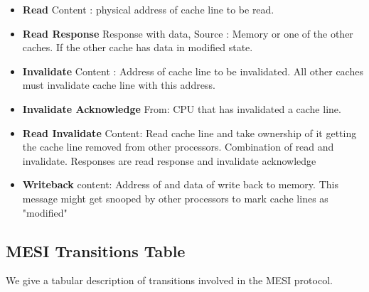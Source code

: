 \documentclass{article}
\begin{document}
\begin{itemize}
\item \textbf{Read} Content : physical address of cache line to be
  read.
\item \textbf{Read Response} Response with data, Source : Memory or
  one of the other caches. If the other cache has data in modified
  state.
\item \textbf{Invalidate} Content : Address of cache line to be
  invalidated. All other caches must invalidate cache line with this
  address.

\item \textbf{Invalidate Acknowledge} From: CPU that has invalidated a
  cache line.

\item \textbf{Read Invalidate} Content: Read cache line and take
  ownership of it getting the cache line removed from other
  processors. Combination of read and invalidate. Responses are read
  response and invalidate acknowledge

\item \textbf{Writeback} content: Address of and data of write back to
  memory. This message might get snooped by other processors to mark
  cache lines as "modified"  
\end{itemize}

\subsection{MESI Transitions Table}

We give a tabular description of transitions involved in the MESI
protocol.
\end{document}
